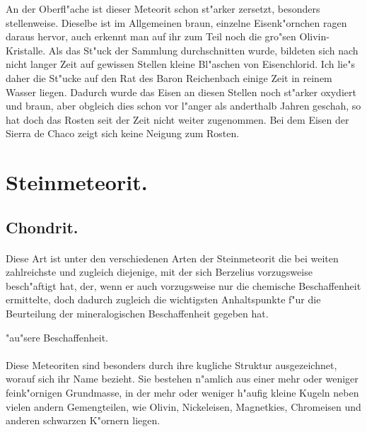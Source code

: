 \documentclass[a4paper, 11pt, oneside]{article}
\begin{document}
An der Oberfl"ache ist dieser Meteorit schon st"arker zersetzt, besonders stellenweise. Dieselbe ist im Allgemeinen braun, einzelne Eisenk"ornchen ragen daraus hervor, auch erkennt man auf ihr zum Teil noch die gro"sen Olivin-Kristalle. Als das St"uck der Sammlung durchschnitten wurde, bildeten sich nach nicht langer Zeit auf gewissen Stellen kleine Bl"aschen von Eisenchlorid. Ich lie"s daher die St"ucke auf den Rat des Baron Reichenbach einige Zeit in reinem Wasser liegen. Dadurch wurde das Eisen an diesen Stellen noch st"arker oxydiert und braun, aber obgleich dies schon vor l"anger als anderthalb Jahren geschah, so hat doch das Rosten seit der Zeit nicht weiter zugenommen. Bei dem Eisen der Sierra de Chaco zeigt sich keine Neigung zum Rosten.
\clearpage
\section{Steinmeteorit.}
\subsection{Chondrit.}
\paragraph{}
Diese Art ist unter den verschiedenen Arten der Steinmeteorit die bei weiten zahlreichste und zugleich diejenige, mit der sich Berzelius vorzugsweise besch"aftigt hat, der, wenn er auch vorzugsweise nur die chemische Beschaffenheit ermittelte, doch dadurch zugleich die wichtigsten Anhaltspunkte f"ur die Beurteilung der mineralogischen Beschaffenheit gegeben hat.
\begin{center}
"au"sere Beschaffenheit.
\end{center}
\paragraph{}
Diese Meteoriten sind besonders durch ihre kugliche Struktur ausgezeichnet, worauf sich ihr Name bezieht. Sie bestehen n"amlich aus einer mehr oder weniger feink"ornigen Grundmasse, in der mehr oder weniger h"aufig kleine Kugeln neben vielen andern Gemengteilen, wie Olivin, Nickeleisen, Magnetkies, Chromeisen und anderen schwarzen K"ornern liegen.
\end{document}
